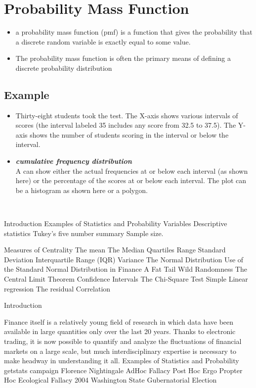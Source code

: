 \section{Probability Mass Function}
\begin{itemize} \item a probability mass function (pmf) is a function that gives the probability that a discrete random variable is exactly equal to some value. \item The probability mass function is often the primary means of defining a discrete probability distribution \end{itemize}
\subsection{Example}
\begin{itemize}
	\item Thirty-eight students took the test. The X-axis shows various intervals of scores (the interval labeled 35 includes any score from 32.5 to 37.5). The Y-axis shows the number of students scoring in the interval or below the interval.
	
	\item \textbf{\emph{cumulative frequency distribution}} \\A  can show either the actual frequencies at or below each interval (as shown here) or the percentage of the scores at or below each interval. The plot can be a histogram as shown here or a polygon.
\end{itemize}



 
 

Introduction
Examples of Statistics and Probability
Variables
Descriptive statistics
Tukey's five number summary
Sample size.

Measures of Centrality
The mean
The Median
Quartiles
Range
Standard Deviation
Interquartile Range (IQR)
Variance
The Normal Distribution
Use of the Standard Normal Distribution in Finance
A Fat Tail
Wild Randomness
The Central Limit Theorem
Confidence Intervals
The Chi-Square Test
Simple Linear regression
The residual
Correlation


Introduction

Finance itself is a relatively young field of research in which data have been available in large quantities only over the last 20 years. Thanks to electronic trading, it is now possible to quantify and analyze the fluctuations of financial markets on a large scale, but much interdisciplinary expertise is necessary to make headway in understanding it all.
Examples of Statistics and Probability
getstats campaign
Florence Nightingale
AdHoc Fallacy
Post Hoc Ergo Propter Hoc
Ecological Fallacy
2004 Washington State Gubernatorial Election

